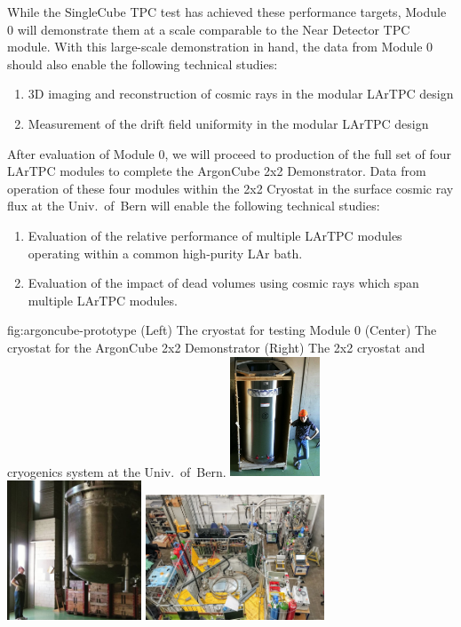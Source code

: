 While the SingleCube TPC test has achieved these performance targets, Module 0 will demonstrate them at a scale comparable to the Near Detector TPC module.  
With this large-scale demonstration in hand, the data from Module 0 should also enable the following technical studies:
\begin{enumerate}
    \item 3D imaging and reconstruction of cosmic rays in the modular LArTPC design
    \item Measurement of the drift field uniformity in the modular LArTPC design
\end{enumerate}

After evaluation of Module 0, we will proceed to production of the full set of four LArTPC modules to complete the ArgonCube 2x2 Demonstrator.  
Data from operation of these four modules within the 2x2 Cryostat in the surface cosmic ray flux at the Univ.~of~Bern will enable the following technical studies:
\begin{enumerate}
    \item Evaluation of the relative performance of multiple LArTPC modules operating within a common high-purity LAr bath.
    \item Evaluation of the impact of dead volumes using cosmic rays which span multiple LArTPC modules.
\end{enumerate}

\begin{dunefigure}{fig:argoncube-prototype}
{(Left) The cryostat for testing Module 0 (Center) The cryostat for the ArgonCube 2x2 Demonstrator (Right) The 2x2 cryostat and cryogenics system at the Univ.~of~Bern.}
\includegraphics[width=0.2\textwidth]{graphics/lartpc/Prototyping/Module0_Cryostat.png}
\includegraphics[width=0.3\textwidth]{graphics/lartpc/Prototyping/2x2Cryostat.png}
\includegraphics[width=0.4\textwidth]{graphics/lartpc/Prototyping/2x2System.png}
\end{dunefigure}

